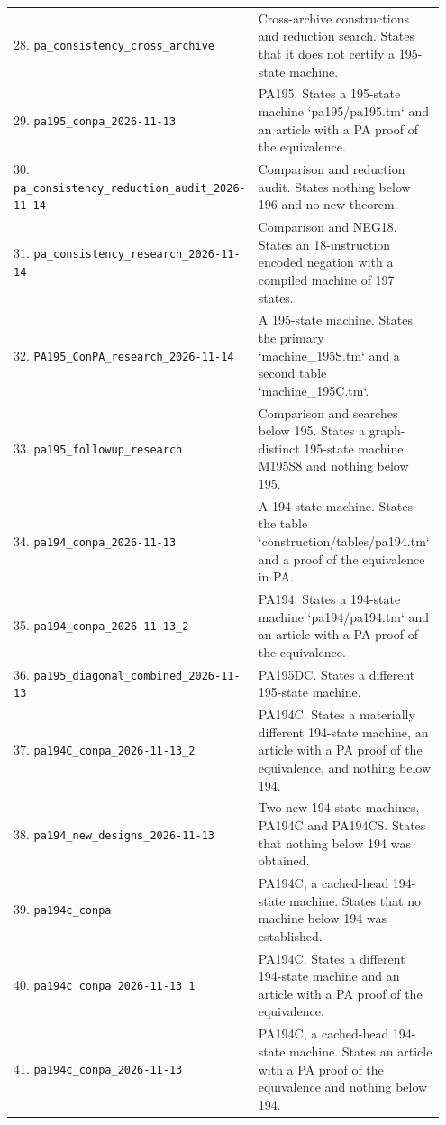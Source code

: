 \begin{longtable}{@{}p{0.37\linewidth}p{0.58\linewidth}@{}}
28. \nolinkurl{pa_consistency_cross_archive} & Cross-archive constructions and reduction search. States that it does not certify a 195-state machine.\\[5pt]
29. \nolinkurl{pa195_conpa_2026-11-13} & PA195. States a 195-state machine `pa195/pa195.tm` and an article with a PA proof of the equivalence.\\[5pt]
30. \nolinkurl{pa_consistency_reduction_audit_2026-11-14} & Comparison and reduction audit. States nothing below 196 and no new theorem.\\[5pt]
31. \nolinkurl{pa_consistency_research_2026-11-14} & Comparison and NEG18. States an 18-instruction encoded negation with a compiled machine of 197 states.\\[5pt]
32. \nolinkurl{PA195_ConPA_research_2026-11-14} & A 195-state machine. States the primary `machine\_195S.tm` and a second table `machine\_195C.tm`.\\[5pt]
33. \nolinkurl{pa195_followup_research} & Comparison and searches below 195. States a graph-distinct 195-state machine M195S8 and nothing below 195.\\[5pt]
34. \nolinkurl{pa194_conpa_2026-11-13} & A 194-state machine. States the table `construction/tables/pa194.tm` and a proof of the equivalence in PA.\\[5pt]
35. \nolinkurl{pa194_conpa_2026-11-13_2} & PA194. States a 194-state machine `pa194/pa194.tm` and an article with a PA proof of the equivalence.\\[5pt]
36. \nolinkurl{pa195_diagonal_combined_2026-11-13} & PA195DC. States a different 195-state machine.\\[5pt]
37. \nolinkurl{pa194C_conpa_2026-11-13_2} & PA194C. States a materially different 194-state machine, an article with a PA proof of the equivalence, and nothing below 194.\\[5pt]
38. \nolinkurl{pa194_new_designs_2026-11-13} & Two new 194-state machines, PA194C and PA194CS. States that nothing below 194 was obtained.\\[5pt]
39. \nolinkurl{pa194c_conpa} & PA194C, a cached-head 194-state machine. States that no machine below 194 was established.\\[5pt]
40. \nolinkurl{pa194c_conpa_2026-11-13_1} & PA194C. States a different 194-state machine and an article with a PA proof of the equivalence.\\[5pt]
41. \nolinkurl{pa194c_conpa_2026-11-13} & PA194C, a cached-head 194-state machine. States an article with a PA proof of the equivalence and nothing below 194.\\[5pt]

\end{longtable}
